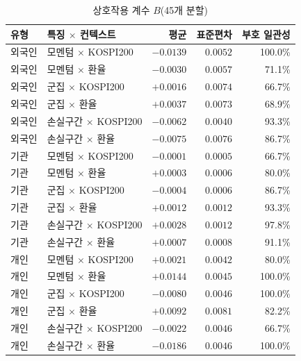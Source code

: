 \begin{table}[htbp]
  \caption{상호작용 계수 $B$(45개 분할)}
  \label{tab:interactions}
  \small
  \centering
  \begin{tabular}{@{}llrrr@{}}
    \toprule
    유형 & 특징 $\times$ 컨텍스트 & 평균 & 표준편차 & 부호 일관성 \\
    \midrule
    외국인 & 모멘텀 $\times$ KOSPI200 & $-0.0139$ & $0.0052$ & 100.0\% \\
    외국인 & 모멘텀 $\times$ 환율     & $-0.0030$ & $0.0057$ & 71.1\% \\
    외국인 & 군집 $\times$ KOSPI200   & $+0.0016$ & $0.0074$ & 66.7\% \\
    외국인 & 군집 $\times$ 환율       & $+0.0037$ & $0.0073$ & 68.9\% \\
    외국인 & 손실구간 $\times$ KOSPI200 & $-0.0062$ & $0.0040$ & 93.3\% \\
    외국인 & 손실구간 $\times$ 환율   & $-0.0075$ & $0.0076$ & 86.7\% \\
    \addlinespace
    기관 & 모멘텀 $\times$ KOSPI200 & $-0.0001$ & $0.0005$ & 66.7\% \\
    기관 & 모멘텀 $\times$ 환율     & $+0.0003$ & $0.0006$ & 80.0\% \\
    기관 & 군집 $\times$ KOSPI200   & $-0.0004$ & $0.0006$ & 86.7\% \\
    기관 & 군집 $\times$ 환율       & $+0.0012$ & $0.0012$ & 93.3\% \\
    기관 & 손실구간 $\times$ KOSPI200 & $+0.0028$ & $0.0012$ & 97.8\% \\
    기관 & 손실구간 $\times$ 환율   & $+0.0007$ & $0.0008$ & 91.1\% \\
    \addlinespace
    개인 & 모멘텀 $\times$ KOSPI200 & $+0.0021$ & $0.0042$ & 80.0\% \\
    개인 & 모멘텀 $\times$ 환율     & $+0.0144$ & $0.0045$ & 100.0\% \\
    개인 & 군집 $\times$ KOSPI200   & $-0.0080$ & $0.0046$ & 100.0\% \\
    개인 & 군집 $\times$ 환율       & $+0.0092$ & $0.0081$ & 82.2\% \\
    개인 & 손실구간 $\times$ KOSPI200 & $-0.0022$ & $0.0046$ & 66.7\% \\
    개인 & 손실구간 $\times$ 환율   & $-0.0186$ & $0.0046$ & 100.0\% \\
    \bottomrule
  \end{tabular}
\end{table}

